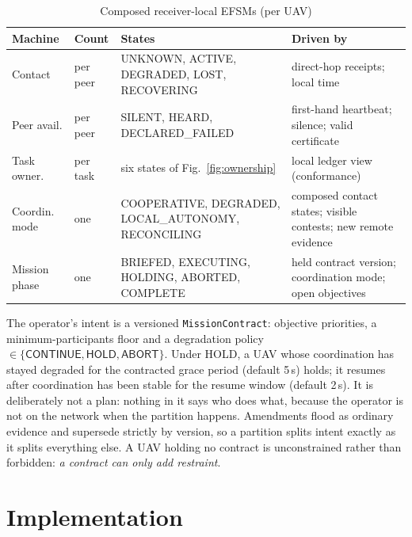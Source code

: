 \documentclass[conference]{IEEEtran}
\newcommand{\stt}[1]{\textsf{#1}}     %
\newcommand{\code}[1]{\texttt{#1}}    %
\begin{document}
\begin{table}[t]
\caption{Composed receiver-local EFSMs (per UAV)}
\label{tab:efsm}
\centering
\footnotesize
\begin{tabular}{@{}L{1.25cm}L{0.7cm}L{2.75cm}L{2.7cm}@{}}
\toprule
Machine & Count & States & Driven by \\
\midrule
Contact & per peer &
\stt{UNKNOWN}, \stt{ACTIVE}, \stt{DEGRADED}, \stt{LOST}, \stt{RECOVERING} &
direct-hop receipts; local time \\
Peer avail. & per peer &
\stt{SILENT}, \stt{HEARD}, \stt{DECLARED\_FAILED} &
first-hand heartbeat; silence; valid certificate \\
Task owner. & per task & six states of Fig.~\ref{fig:ownership} &
local ledger view (conformance) \\
Coordin. mode & one &
\stt{COOPERATIVE}, \stt{DEGRADED}, \stt{LOCAL\_AUTONOMY}, \stt{RECONCILING} &
composed contact states; visible contests; new remote evidence \\
Mission phase & one &
\stt{BRIEFED}, \stt{EXECUTING}, \stt{HOLDING}, \stt{ABORTED}, \stt{COMPLETE} &
held contract version; coordination mode; open objectives \\
\bottomrule
\end{tabular}
\end{table}

The operator's intent is a versioned \code{MissionContract}: objective
priorities, a minimum-participants floor and a degradation policy
$\in\{\stt{CONTINUE},\stt{HOLD},\stt{ABORT}\}$. Under \stt{HOLD}, a UAV whose
coordination has stayed degraded for the contracted grace period (default
5\,s) holds; it resumes after coordination has been stable for the resume
window (default 2\,s). It is deliberately not a plan: nothing in it says who
does what, because the operator is not on the network when the partition
happens. Amendments flood as ordinary evidence and supersede strictly by
version, so a partition splits intent exactly as it splits everything else.
A UAV holding no contract is unconstrained rather than forbidden: \emph{a
contract can only add restraint}.


\section{Implementation}
\label{sec:impl}
\end{document}
